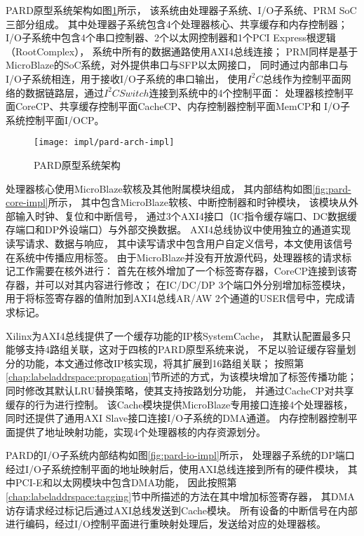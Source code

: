 PARD原型系统架构如图\ref{fig:pard-arch-impl}所示，
该系统由处理器子系统、I/O子系统、PRM SoC三部分组成。
其中处理器子系统包含4个处理器核心、共享缓存和内存控制器；
I/O子系统中包含4个串口控制器、2个以太网控制器和1个PCI Express根逻辑（RootComplex），
系统中所有的数据通路使用AXI4总线连接；
PRM同样是基于MicroBlaze的SoC系统，对外提供串口与SFP以太网接口，
同时通过内部串口与I/O子系统相连，用于接收I/O子系统的串口输出，
使用$I^2C$总线作为控制平面网络的数据链路层，通过$I^2C Switch$连接到系统中的4个控制平面：
处理器核控制平面CoreCP、共享缓存控制平面CacheCP、内存控制器控制平面MemCP和
I/O子系统控制平面I/OCP。

\begin{figure}[tb]
  \centering
  \texttt{[image: impl/pard-arch-impl]}
  \caption{PARD原型系统架构}
  \label{fig:pard-arch-impl}
\end{figure}

处理器核心使用MicroBlaze软核及其他附属模块组成，
其内部结构如图\ref{fig:pard-core-impl}所示，
其中包含MicroBlaze软核、中断控制器和时钟模块，
该模块从外部输入时钟、复位和中断信号，
通过3个AXI4接口（IC指令缓存端口、DC数据缓存端口和DP外设端口）与外部交换数据。
AXI4总线协议中使用独立的通道实现读写请求、数据与响应，
其中读写请求中包含用户自定义信号，本文使用该信号在系统中传播应用标签。
由于MicroBlaze并没有开放源代码，处理器核的请求标记工作需要在核外进行：
首先在核外增加了一个标签寄存器，CoreCP连接到该寄存器，并可以对其内容进行修改；
在IC/DC/DP 3个端口外分别增加标签模块，
用于将标签寄存器的值附加到AXI4总线AR/AW 2个通道的USER信号中，完成请求标记。

Xilinx为AXI4总线提供了一个缓存功能的IP核SystemCache\cite{pg118-system-cache}，
其默认配置最多只能够支持4路组关联，这对于四核的PARD原型系统来说，
不足以验证缓存容量划分的功能，本文通过修改IP核实现，将其扩展到16路组关联；
按照第\ref{chap:labeladdrspace:propagation}节所述的方式，为该模块增加了标签传播功能；
同时修改其默认LRU替换策略，使其支持按路划分功能，
并通过CacheCP对共享缓存的行为进行控制。%
该Cache模块提供MicroBlaze专用接口连接4个处理器核，
同时还提供了通用AXI Slave接口连接I/O子系统的DMA通道。
内存控制器控制平面提供了地址映射功能，实现4个处理器核的内存资源划分。

PARD的I/O子系统内部结构如图\ref{fig:pard-io-impl}所示，
处理器子系统的DP端口经过I/O子系统控制平面的地址映射后，使用AXI总线连接到所有的硬件模块，
其中PCI-E和以太网模块中包含DMA功能，
因此按照第\ref{chap:labeladdrspace:tagging}节中所描述的方法在其中增加标签寄存器，
其DMA访存请求经过标记后通过AXI总线发送到Cache模块。
所有设备的中断信号在内部进行编码，经过I/O控制平面进行重映射处理后，发送给对应的处理器核。

